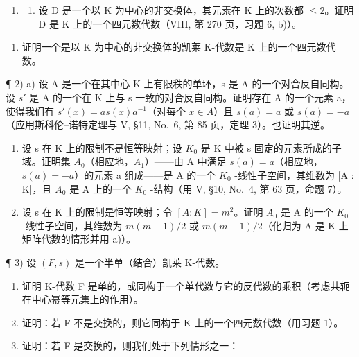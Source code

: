 
\begin{enumerate}
\def\labelenumi{\arabic{enumi})}
\tightlist
\item
  \begin{enumerate}
  \def\labelenumii{\alph{enumii})}
  \tightlist
  \item
    设 D 是一个以 K 为中心的非交换体，其元素在 K 上的次数都 \(\leqslant 2\)。证明 D 是 K 上的一个四元数代数（VIII, 第 270 页，习题 6, b)）。
  \end{enumerate}
\end{enumerate}

\begin{enumerate}
\def\labelenumi{\alph{enumi})}
\setcounter{enumi}{1}
\tightlist
\item
  证明一个是以 K 为中心的非交换体的凯莱 K-代数是 K 上的一个四元数代数。
\end{enumerate}

¶ 2) a) 设 A 是一个在其中心 K 上有限秩的单环，s 是 A 的一个对合反自同构。设 \(s'\) 是 A 的一个在 K 上与 s 一致的对合反自同构。证明存在 A 的一个元素 a，使得我们有 \(s'(x) = as(x)a^{-1}\)（对每个 \(x \in A\)）且 \(s(a) = a\) 或 \(s(a) = -a\)（应用斯科伦--诺特定理与 V, §11, No.~6, 第 85 页，定理 3）。也证明其逆。

\begin{enumerate}
\def\labelenumi{\alph{enumi})}
\setcounter{enumi}{1}
\item
  设 s 在 K 上的限制不是恒等映射；设 \(K_{0}\) 是 K 中被 s 固定的元素所成的子域。证明集 \(A_{0}\)（相应地，\(A_{1}\)）——由 A 中满足 \(s(a) = a\)（相应地，\(s(a) = -a\)）的元素 a 组成——是 A 的一个 \(K_{0}\) -线性子空间，其维数为 {[}A : K{]}，且 \(A_{0}\) 是 A 上的一个 \(K_{0}\) -结构（用 V, §10, No.~4, 第 63 页，命题 7）。
\item
  设 s 在 K 上的限制是恒等映射；令 \([A:K]=m^{2}\)。证明 \(A_{0}\) 是 A 的一个 \(K_{0}\) -线性子空间，其维数为 \(m(m+1)/2\) 或 \(m(m-1)/2\)（化归为 A 是 K 上矩阵代数的情形并用 a)）。
\end{enumerate}

¶ 3) 设 \((F, s)\) 是一个半单（结合）凯莱 K-代数。

\begin{enumerate}
\def\labelenumi{\alph{enumi})}
\item
  证明 K-代数 F 是单的，或同构于一个单代数与它的反代数的乘积（考虑共轭在中心幂等元集上的作用）。
\item
  证明：若 F 不是交换的，则它同构于 K 上的一个四元数代数（用习题 1）。
\item
  证明：若 F 是交换的，则我们处于下列情形之一：
\end{enumerate}

